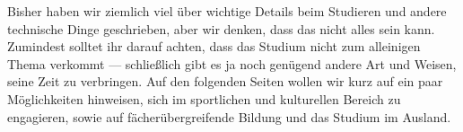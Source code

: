 Bisher haben wir ziemlich viel über wichtige Details beim Studieren
  und andere technische Dinge geschrieben, aber wir denken, dass das
  nicht alles sein kann.  Zumindest solltet ihr darauf achten, dass
  das Studium nicht zum alleinigen Thema verkommt --- schließlich
  gibt es ja noch genügend andere Art und Weisen, seine Zeit zu
  verbringen.  Auf den folgenden Seiten wollen wir kurz auf ein paar
  Möglichkeiten hinweisen, sich im sportlichen und kulturellen Bereich zu
  engagieren, sowie auf fächerübergreifende Bildung und das Studium im Ausland.
 
